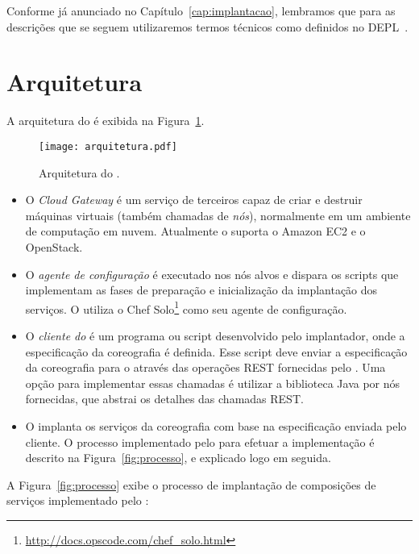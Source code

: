 Conforme já anunciado no Capítulo~\ref{cap:implantacao},
lembramos que para as descrições que se seguem utilizaremos
termos técnicos como definidos no DEPL~\cite{DEPL2006}.

\section{Arquitetura}

A arquitetura do \ee é exibida na Figura~\ref{fig:arquitetura}.

\begin{figure}[ht]
\centering
\texttt{[image: arquitetura.pdf]}
\caption{Arquitetura do \choreos \ee.}
\label{fig:arquitetura}
\end{figure}

\begin{itemize}

\item O \emph{Cloud Gateway} é um serviço de terceiros capaz de criar e destruir máquinas virtuais 
(também chamadas de \emph{nós}), normalmente em um ambiente de computação em nuvem. 
Atualmente o \ee suporta o Amazon EC2 e o OpenStack.

\item O \emph{agente de configuração} é executado nos nós alvos
e dispara os scripts que implementam as fases de preparação
e inicialização da implantação dos serviços.
O \ee utiliza o Chef Solo\footnote{\url{http://docs.opscode.com/chef_solo.html}}
como seu agente de configuração.

\item O \emph{cliente do \ee} é um programa ou script desenvolvido
pelo implantador, onde a especificação da coreografia é definida.
Esse script deve enviar a especificação da coreografia para o \ee
através das operações REST fornecidas pelo \ee.
Uma opção para implementar essas chamadas é utilizar
a biblioteca Java por nós fornecidas, que abstrai os detalhes
das chamadas REST.

\item O \emph{\ee} implanta os serviços da coreografia
com base na especificação enviada pelo cliente.
O processo implementado pelo \ee para efetuar a implementação
é descrito na Figura~\ref{fig:processo}, e explicado logo em seguida. 

\end{itemize} 

A Figura~\ref{fig:processo} exibe o processo de implantação de composições
de serviços implementado pelo \ee:

